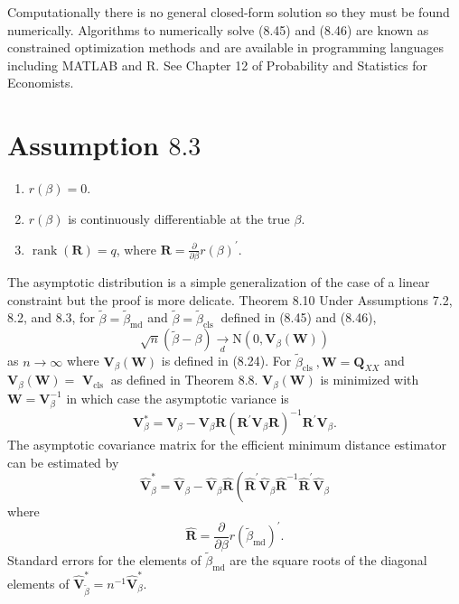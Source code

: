 \documentclass[10pt]{article}
\begin{document}
Computationally there is no general closed-form solution so they must be found numerically. Algorithms to numerically solve (8.45) and (8.46) are known as constrained optimization methods and are available in programming languages including MATLAB and R. See Chapter 12 of Probability and Statistics for Economists.

\section{Assumption $8.3$}
\begin{enumerate}
  \item $r(\beta)=0$.

  \item $r(\beta)$ is continuously differentiable at the true $\beta$.

  \item $\operatorname{rank}(\boldsymbol{R})=q$, where $\boldsymbol{R}=\frac{\partial}{\partial \beta} r(\beta)^{\prime}$.

\end{enumerate}
The asymptotic distribution is a simple generalization of the case of a linear constraint but the proof is more delicate. Theorem 8.10 Under Assumptions 7.2, 8.2, and 8.3, for $\widetilde{\beta}=\widetilde{\beta}_{\mathrm{md}}$ and $\widetilde{\beta}=\widetilde{\beta}_{\text {cls }}$ defined in (8.45) and (8.46),
$$
\sqrt{n}(\widetilde{\beta}-\beta) \underset{d}{\longrightarrow} \mathrm{N}\left(0, \boldsymbol{V}_{\beta}(\boldsymbol{W})\right)
$$
as $n \rightarrow \infty$ where $\boldsymbol{V}_{\beta}(\boldsymbol{W})$ is defined in (8.24). For $\widetilde{\beta}_{\text {cls }}, \boldsymbol{W}=\boldsymbol{Q}_{X X}$ and $\boldsymbol{V}_{\beta}(\boldsymbol{W})=$ $\boldsymbol{V}_{\text {cls }}$ as defined in Theorem 8.8. $\boldsymbol{V}_{\beta}(\boldsymbol{W})$ is minimized with $\boldsymbol{W}=\boldsymbol{V}_{\beta}^{-1}$ in which case the asymptotic variance is
$$
\boldsymbol{V}_{\beta}^{*}=\boldsymbol{V}_{\beta}-\boldsymbol{V}_{\beta} \boldsymbol{R}\left(\boldsymbol{R}^{\prime} \boldsymbol{V}_{\beta} \boldsymbol{R}\right)^{-1} \boldsymbol{R}^{\prime} \boldsymbol{V}_{\beta} .
$$
The asymptotic covariance matrix for the efficient minimum distance estimator can be estimated by
$$
\widehat{\boldsymbol{V}}_{\beta}^{*}=\widehat{\boldsymbol{V}}_{\beta}-\widehat{\boldsymbol{V}}_{\beta} \widehat{\boldsymbol{R}}\left(\widehat{\boldsymbol{R}}^{\prime} \widehat{\boldsymbol{V}}_{\beta} \widehat{\boldsymbol{R}}^{-1} \widehat{\boldsymbol{R}}^{\prime} \widehat{\boldsymbol{V}}_{\beta}\right.
$$
where
$$
\widehat{\boldsymbol{R}}=\frac{\partial}{\partial \beta} r\left(\widetilde{\beta}_{\mathrm{md}}\right)^{\prime} .
$$
Standard errors for the elements of $\widetilde{\beta}_{\mathrm{md}}$ are the square roots of the diagonal elements of $\widehat{\boldsymbol{V}}_{\widetilde{\beta}}^{*}=n^{-1} \widehat{\boldsymbol{V}}_{\beta}^{*}$.
\end{document}
